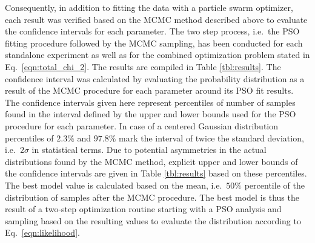 \documentclass{iucr}              %
\begin{document}
Consequently, in addition to fitting the data with a particle swarm optimizer, each result was verified based on the MCMC method described above to evaluate the confidence intervals for each parameter. The two step process, i.e.~the PSO fitting procedure followed by the MCMC sampling, has been conducted for each standalone experiment as well as for the combined optimization problem stated in Eq.~\eqref{eqn:total_chi_2}. The results are compiled in Table \ref{tbl:results}. The confidence interval was calculated by evaluating the probability distribution as a result of the MCMC procedure for each parameter around its PSO fit results. The confidence intervals given here represent percentiles of number of samples found in the interval defined by the upper and lower bounds used for the PSO procedure for each parameter. In case of a centered Gaussian distribution percentiles of $2.3\%$ and $97.8\%$ mark the interval of twice the standard deviation, i.e.~$2\sigma$ in statistical terms. Due to potential asymmetries in the actual distributions found by the MCMC method, explicit upper and lower bounds of the confidence intervals are given in Table \ref{tbl:results} based on these percentiles. The best model value is calculated based on the mean, i.e.~$50\%$ percentile of the distribution of samples after the MCMC procedure. The best model is thus the result of a two-step optimization routine starting with a PSO analysis and sampling based on the resulting values to evaluate the distribution according to Eq.~\eqref{eqn:likelihood}.
\onecolumn
\end{document}

